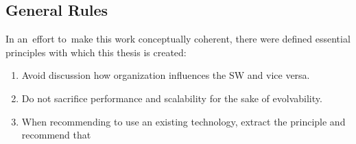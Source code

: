 \documentclass[thesis=M,english,hidelinks]{FITthesis}[2012/10/20]
\begin{document}
\subsection{General Rules}
In an~effort to~make this work conceptually coherent, there were defined essential principles with which this thesis is created:
\begin{enumerate}
    \item Avoid discussion how organization influences the \acrshort{SW} and vice versa.
    \item Do not sacrifice performance and scalability for the sake of evolvability.
    \item When recommending to use an existing technology, extract the principle and recommend that 
\end{enumerate}
\end{document}
